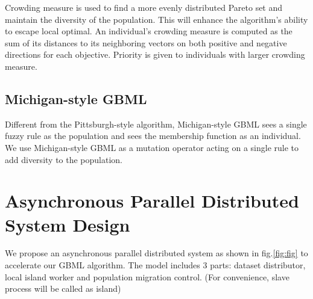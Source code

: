 \documentclass[conference]{IEEEtran}
\begin{document}
	 Crowding measure is used to find a more evenly distributed Pareto set and maintain the diversity of the population. This will enhance the algorithm's ability to escape local optimal. An individual's crowding measure is computed as the sum of its distances to its neighboring vectors on both positive and negative directions for each objective. Priority is given to individuals with larger crowding measure.
	 
	 \subsection{Michigan-style GBML}
	 
   Different from the Pittsburgh-style algorithm, Michigan-style GBML sees a single fuzzy rule as the population and sees the membership function as an individual. We use Michigan-style GBML as a mutation operator acting on a single rule to add diversity to the population. 
   
  
   
  \section{Asynchronous Parallel Distributed System Design}
  We propose an asynchronous parallel distributed system as shown in fig.\ref{fig:fig} to accelerate our GBML algorithm. The model includes 3 parts: dataset distributor, local island worker and population migration control. (For convenience, slave process will be called as island)
\end{document}
